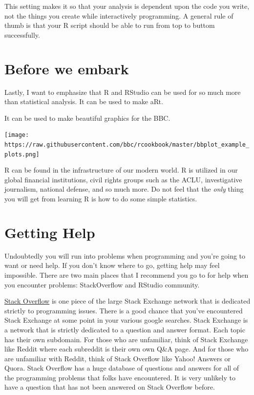 \documentclass[
]{book}
\begin{document}
This setting makes it so that your analysis is dependent upon the code you write, not the things you create while interactively programming. A general rule of thumb is that your R script should be able to run from top to buttom successfully.

\hypertarget{before-we-embark}{%
\section{Before we embark}\label{before-we-embark}}

Lastly, I want to emphasize that R and RStudio can be used for so much more than statistical analysis. It can be used to make aRt.

It can be used to make beautiful graphics for the BBC.

\texttt{[image: https://raw.githubusercontent.com/bbc/rcookbook/master/bbplot\_example\_plots.png]}

R can be found in the infrastructure of our modern world. R is utilized in our global financial institutions, civil rights groups such as the ACLU, investigative journalism, national defense, and so much more. Do not feel that the \emph{only} thing you will get from learning R is how to do some simple statistics.

\hypertarget{getting-help}{%
\section{Getting Help}\label{getting-help}}

Undoubtedly you will run into problems when programming and you're going to want or need help. If you don't know where to go, getting help may feel impossible. There are two main places that I recommend you go to for help when you encounter problems: StackOverflow and RStudio community.

\href{https://stackoverflow.com}{Stack Overflow} is one piece of the large Stack Exchange network that is dedicated strictly to programming issues. There is a good chance that you've encountered Stack Exchange at some point in your various google searches. Stack Exchange is a network that is strictly dedicated to a question and answer format. Each topic has their own subdomain. For those who are unfamiliar, think of Stack Exchange like Reddit where each subreddit is their own own Q\&A page. And for those who are unfamiliar with Reddit, think of Stack Overflow like Yahoo! Answers or Quora. Stack Overflow has a huge database of questions and answers for all of the programming problems that folks have encountered. It is very unlikely to have a question that has not been answered on Stack Overflow before.
\end{document}
